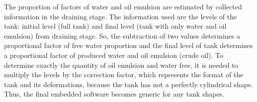\documentclass[11pt]{article} %
\begin{document}

The proportion of factors of water and oil emulsion are estimated by collected
information in the draining stage. The information used are the levels of the
tank: initial level (full tank) and final level (tank with only water and oil
emulsion) from draining stage. So, the subtraction of two values determines a
proportional factor of free water proportion and the final level of tank
determines a proportional factor of produced water and oil emulsion (crude oil).
To determine exactly the quantity of oil emulsion and water free, it is needed to
multiply the levels by the correction factor, which represents the format of the
tank and its deformations, because the tank has not a perfectly cylindrical
shape. Thus, the final embedded software becomes generic for any tank shapes.


\end{document}
